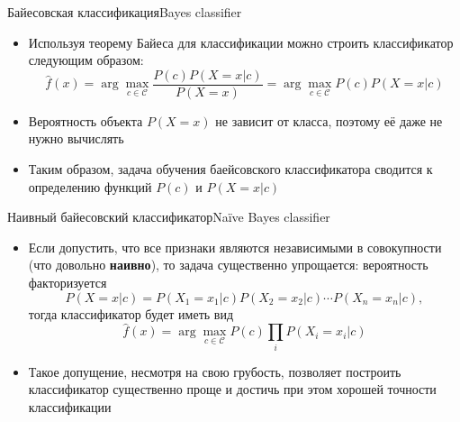 \documentclass[compress,red,unicode]{beamer}
\begin{document}
\begin{frame}{Байесовская классификация}{Bayes classifier}
\begin{itemize}
\item Используя теорему Байеса для классификации можно строить классификатор следующим образом:
\begin{equation*} 
\hat f(x) = \arg \max_{c \in \mathcal{C}} \frac{P(c) P(X=x|c)}{P(X=x)} = \arg\max_{c\in\mathcal{C}} P(c) P(X=x|c)
\end{equation*}
\item Вероятность объекта $P(X=x)$ не зависит от класса, поэтому её даже не нужно вычислять
\item Таким образом, задача обучения баейсовского классификатора сводится к определению функций $P (c)$ и $P(X=x|c)$

\end{itemize}
\end{frame}


\begin{frame}{Наивный байесовский классификатор}{Naïve Bayes classifier}
\begin{itemize}
\item Если допустить, что все признаки являются независимыми в совокупности (что довольно {\bf наивно}), то задача существенно упрощается: вероятность факторизуется
$$
P (X=x| c) = P (X_1 = x_1 | c) P(X_2 = x_2 | c) \cdots P (X_n = x_n | c), 
$$
тогда классификатор будет иметь вид
$$
\hat f(x) = \arg \max_{c \in \mathcal{C}} P (c) \prod_i P (X_i = x_i | c)%
$$
\item Такое допущение, несмотря на свою грубость, позволяет построить классификатор существенно проще и достичь при этом хорошей точности классификации
\end{itemize}


\end{frame}
\end{document}
